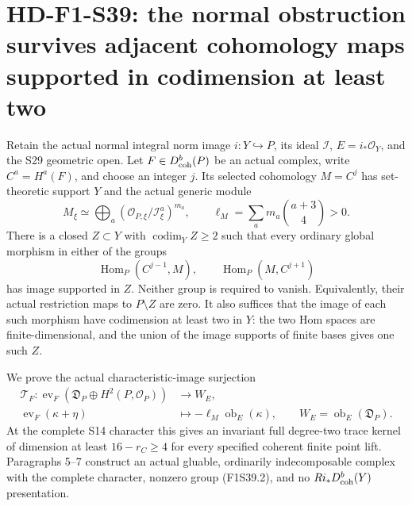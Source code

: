 \section[HD-F1-S39: cohomology defects in codimension two]{HD-F1-S39: the normal obstruction survives adjacent cohomology maps supported in codimension at least two}
\label{sec:f1-norm-fourfold-codimension-two-cohomology}

Retain the actual normal integral norm image
$i:Y\hookrightarrow P$, its ideal $\mathcal I$,
$E=i_*\mathcal O_Y$, and the S29 geometric open.
Let $F\in D^b_{\rm coh}(P)$ be an actual complex,
write $C^a=H^a(F)$, and choose an integer $j$.
Its selected cohomology $M=C^j$ has set-theoretic
support $Y$ and the actual generic module
\[
 M_\xi\simeq\bigoplus_a
       (\mathcal O_{P,\xi}/\mathcal I_\xi^a)^{m_a},
 \qquad \ell_M=\sum_a m_a\binom{a+3}{4}>0.
 \tag{F1S39.1}
\]
There is a closed $Z\subset Y$ with
$\operatorname{codim}_Y Z\ge2$ such that every
ordinary global morphism in either of the groups
\[
 \operatorname{Hom}_P(C^{j-1},M),\qquad
 \operatorname{Hom}_P(M,C^{j+1})
 \tag{F1S39.2}
\]
has image supported in $Z$. Neither group is
required to vanish. Equivalently, their actual
restriction maps to $P\setminus Z$ are zero.
It also suffices that the image of each such
morphism have codimension at least two in $Y$:
the two Hom spaces are finite-dimensional, and
the union of the image supports of finite bases
gives one such $Z$.

We prove the actual characteristic-image surjection
\[
\begin{split}
 \mathcal T_F:\operatorname{ev}_F
   (\mathfrak D_P\oplus H^2(P,\mathcal O_P))
       &\longrightarrow W_E,\\
 \operatorname{ev}_F(\kappa+\eta)
       &\longmapsto-\ell_M\operatorname{ob}_E(\kappa),
 \qquad W_E=\operatorname{ob}_E(\mathfrak D_P).
\end{split}
 \tag{F1S39.3}
\]
At the complete S14 character this gives an
invariant full degree-two trace kernel of dimension
at least $16-r_C\ge4$ for every specified coherent
finite point lift. Paragraphs 5--7 construct an
actual gluable, ordinarily indecomposable complex
with the complete character, nonzero group
(F1S39.2), and no $Ri_*D^b_{\rm coh}(Y)$
presentation.

